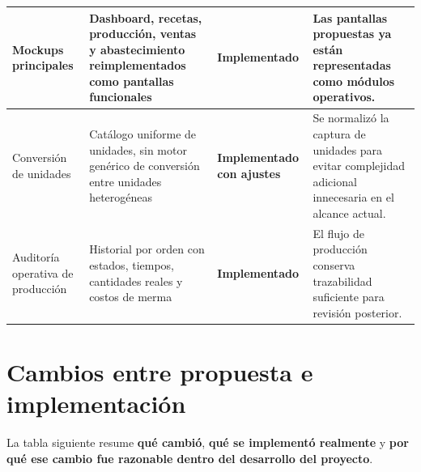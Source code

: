 \documentclass[12pt,letterpaper]{article}
\newcommand{\ok}{\textbf{Implementado}}
\newcommand{\adj}{\textbf{Implementado con ajustes}}
\begin{document}
\begin{longtable}{|p{3.5cm}|p{3.2cm}|p{2.4cm}|p{5.7cm}|}
\hline
Mockups principales & Dashboard, recetas, producción, ventas y abastecimiento reimplementados como pantallas funcionales & \ok & Las pantallas propuestas ya están representadas como módulos operativos. \\
\hline
Conversión de unidades & Catálogo uniforme de unidades, sin motor genérico de conversión entre unidades heterogéneas & \adj & Se normalizó la captura de unidades para evitar complejidad adicional innecesaria en el alcance actual. \\
\hline
Auditoría operativa de producción & Historial por orden con estados, tiempos, cantidades reales y costos de merma & \ok & El flujo de producción conserva trazabilidad suficiente para revisión posterior. \\
\hline
\end{longtable}

\section{Cambios entre propuesta e implementación}

La tabla siguiente resume \textbf{qué cambió}, \textbf{qué se implementó realmente} y \textbf{por qué ese cambio fue razonable dentro del desarrollo del proyecto}.
\end{document}
